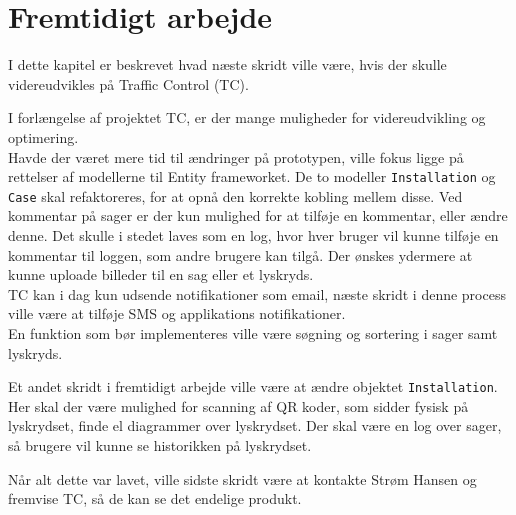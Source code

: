 \chapter{Fremtidigt arbejde}
I dette kapitel er beskrevet hvad næste skridt ville være, hvis der skulle videreudvikles på Traffic Control (TC).

I forlængelse af projektet TC, er der mange muligheder for videreudvikling og optimering. \\
Havde der været mere tid til ændringer på prototypen, ville fokus ligge på rettelser af modellerne til Entity frameworket. De to modeller \texttt{Installation} og \texttt{Case} skal refaktoreres, for at opnå den korrekte kobling mellem disse.
Ved kommentar på sager er der kun mulighed for at tilføje en kommentar, eller ændre denne. Det skulle i stedet laves som en log, hvor hver bruger vil kunne tilføje en kommentar til loggen, som andre brugere kan tilgå. Der ønskes ydermere at kunne uploade billeder til en sag eller et lyskryds.\\
TC kan i dag kun udsende notifikationer som email, næste skridt i denne process ville være at tilføje SMS og applikations notifikationer.\\ 
En funktion som bør implementeres ville være søgning og sortering i sager samt lyskryds.

Et andet skridt i fremtidigt arbejde ville være at ændre objektet \texttt{Installation}. Her skal der være mulighed for scanning af QR koder, som sidder fysisk på lyskrydset, finde el diagrammer over lyskrydset. Der skal være en log over sager, så brugere vil kunne se historikken på lyskrydset.

Når alt dette var lavet, ville sidste skridt være at kontakte Strøm Hansen og fremvise TC, så de kan se det endelige produkt.